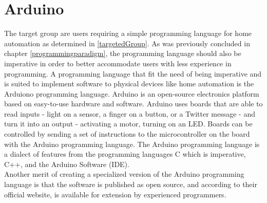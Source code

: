 \section{Arduino}
The target group are users requiring a simple programming language for home automation as determined in \ref{targetedGroup}. As was previously concluded in chapter \ref{programmingparadigm}, the programming language should also be imperative in order to better accommodate users with less experience in programming. 
A programming language that fit the need of being imperative and is suited to implement software to physical devices like home automation is the Arduiono programming language. Arduino is an open-source electronics platform based on easy-to-use hardware and software. Arduino uses boards that are able to read inputs - light on a sensor, a finger on a button, or a Twitter message - and turn it into an output - activating a motor, turning on an LED. Boards can be controlled by sending a set of instructions to the microcontroller on the board with the Arduino programming language. The Arduino programming language is a dialect of features from the programming languages C which is imperative, C++, and the Arduino Software (IDE)\cite{audionocc}. \\ 


Another merit of creating a specialized version of the Arduino programming language is that the software is published as open source, and according to their official website, is available for extension by experienced programmers\cite{audionocc}.








